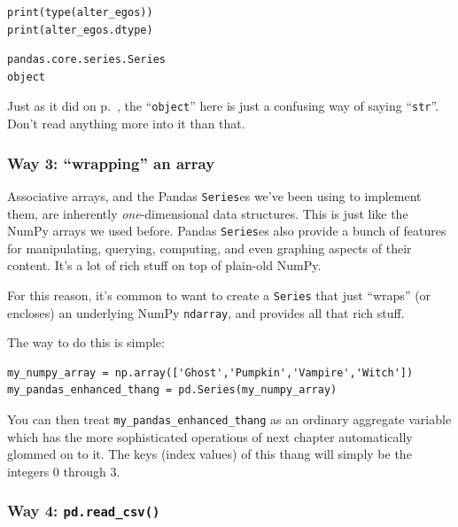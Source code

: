 \begin{Verbatim}[fontsize=\small,samepage=true,frame=single,framesep=3mm]
print(type(alter_egos))
print(alter_egos.dtype)
\end{Verbatim}

\begin{Verbatim}[fontsize=\small,samepage=true,frame=leftline,framesep=5mm,framerule=1mm]
pandas.core.series.Series
object
\end{Verbatim}

Just as it did on p.~\pageref{dtypeRules}, the ``\texttt{object}'' here is just
a confusing way of saying ``\texttt{str}''. Don't read anything more into it
than that.

\subsubsection{Way 3: ``wrapping'' an array}

\label{wrap}

Associative arrays, and the Pandas \texttt{Series}es we've been using to
implement them, are inherently \textit{one}-dimensional data structures. This
is just like the NumPy arrays we used before. Pandas \texttt{Series}es also
provide a bunch of features for manipulating, querying, computing, and even
graphing aspects of their content. It's a lot of rich stuff on top of plain-old
NumPy.


For this reason, it's common to want to create a \texttt{Series} that just
``wraps'' (or encloses) an underlying NumPy \texttt{ndarray}, and provides all
that rich stuff.

The way to do this is simple:

\begin{Verbatim}[fontsize=\footnotesize,samepage=true,frame=single,framesep=3mm]
my_numpy_array = np.array(['Ghost','Pumpkin','Vampire','Witch'])
my_pandas_enhanced_thang = pd.Series(my_numpy_array)
\end{Verbatim}

You can then treat \texttt{my\_pandas\_enhanced\_thang} as an ordinary
aggregate variable which has the more sophisticated operations of next chapter
automatically glommed on to it. The keys (index values) of this thang will
simply be the integers 0 through 3.

\subsubsection{Way 4: \texttt{pd.read\_csv()}}

